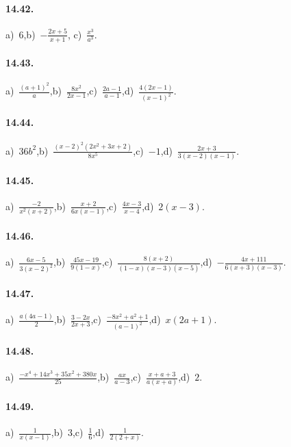 \paragraph{14.42.}
a)~$6$,\quad b)~$-\frac{2x+5}{x+1}$, \quad c)~$\frac{x^{3}}{a^{3}}$.

\paragraph{14.43.}
a)~$\frac{(a+1)^{2}}{a}$,\quad b)~$\frac{8x^{2}}{2x-1}$,\quad c)~$\frac{2a-1}{a-1}$,\quad d)~$\frac{4(2x-1)}{(x-1)^{2}}$.

\paragraph{14.44.}
a)~$36b^{2}$,\quad b)~$\frac{(x-2)^{2}(2x^{2}+3x+2)}{8x^{5}}$,\quad c)~$-1$,\quad d)~$\frac{2x+3}{3(x-2)(x-1)}$.

\paragraph{14.45.}
a)~$\frac{-2}{x^{2}(x+2)}$,\quad b)~$\frac{x+2}{6x(x-1)}$,\quad c)~$\frac{4x-3}{x-4}$,\quad d)~$2(x-3)$.

\paragraph{14.46.}
a)~$\frac{6x-5}{3(x-2)^{2}}$,\quad b)~$\frac{45x-19}{9(1-x)}$,\quad c)~$\frac{8(x+2)}{(1-x)(x-3)(x-5)}$,\quad d)~$-\frac{4x+111}{6(x+3)(x-3)}$.

\paragraph{14.47.}
a)~$\frac{a(4a-1)}{2}$,\quad b)~$\frac{3-2x}{2x+3}$,\quad c)~$\frac{-8x^2+a^2+1}{(a-1)^2}$,\quad d)~$x(2a+1)$.

\paragraph{14.48.}
a)~$\frac{-x^4+14x^3+35x^2+380x}{25}$,\quad b)~$\frac{ax}{a-3}$,\quad c)~$\frac{x+a+3}{a(x+a)}$,\quad d)~$2$.

\paragraph{14.49.}
a)~$\frac{1}{x(x-1)}$,\quad b)~$3$,\quad c)~$\frac{1}{6}$,\quad d)~$\frac{1}{2(2+x)}$.

